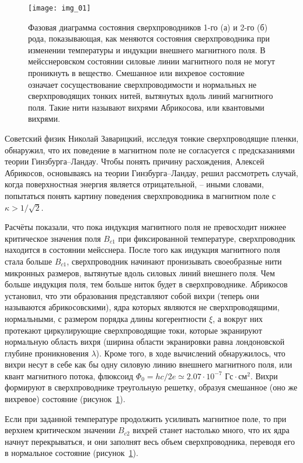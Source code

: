 \begin{figure}[h!]
    \center
    \texttt{[image: img\_01]}
    \caption{Фазовая диаграмма состояния сверхпроводников 1-го (а) и 
        2-го (б) рода, показывающая, как меняются состояния сверхпроводника 
        при изменении температуры и индукции внешнего магнитного поля. В 
        мейсснеровском состоянии силовые линии магнитного поля не могут 
        проникнуть в вещество. Смешанное или вихревое состояние означает 
        сосуществование сверхпроводимости и нормальных не сверхпроводящих 
        тонких нитей, вытянутых вдоль линий магнитного поля. Такие нити 
        называют вихрями Абрикосова, или квантовыми вихрями.}
    \label{img:01}
\end{figure}

Советский физик Николай Заварицкий, исследуя тонкие сверхпроводящие пленки, 
обнаружил, что их поведение в магнитном поле не согласуется с предсказаниями 
теории Гинзбурга–Ландау. Чтобы понять причину расхождения, Алексей Абрикосов, 
основываясь на теории Гинзбурга–Ландау, решил рассмотреть случай, когда 
поверхностная энергия является отрицательной, -- иными словами, попытаться 
понять картину поведения сверхпроводника в магнитном поле с 
\( \kappa > 1/\sqrt{2} \).

Расчёты показали, что пока индукция магнитного поля не превосходит нижнее 
критическое значения поля \( B_{c1} \) при фиксированной температуре, 
сверхпроводник находится в состоянии мейсснера. После того как индукция 
магнитного поля стала больше \( B_{c1} \), сверхпроводник начинают пронизывать 
своеобразные нити микронных размеров, вытянутые вдоль силовых линий внешнего 
поля. Чем больше индукция поля, тем больше ниток будет в сверхпроводнике. 
Абрикосов установил, что эти образования представляют собой вихри (теперь они 
называются абрикосовскими), ядра которых являются не сверхпроводящими, 
нормальными, с размером порядка длины когерентности \( \xi \), а вокруг них 
протекают циркулирующие сверхпроводящие токи, которые экранируют нормальную 
область вихря (ширина области экранировки равна лондоновской глубине 
проникновения \( \lambda \)). Кроме того, в ходе вычислений обнаружилось, что 
вихри несут в себе как бы одну силовую линию внешнего магнитного поля, или 
квант магнитного потока, флюксоид 
\( \Phi_0 = hc/2e \simeq 2.07\cdot10^{-7} \text{ Гс}\cdot\text{см}^2 \). Вихри 
формируют в сверхпроводнике треугольную решетку, образуя смешанное (оно же 
вихревое) состояние (рисунок~\ref{img:01}).

Если при заданной температуре продолжить усиливать магнитное поле, то при 
верхнем критическом значении \( B_{c2} \) вихрей станет настолько много, что 
их ядра начнут перекрываться, и они заполнят весь объем сверхпроводника, 
переводя его в нормальное состояние (рисунок~\ref{img:01}). \cite{bib:net}


